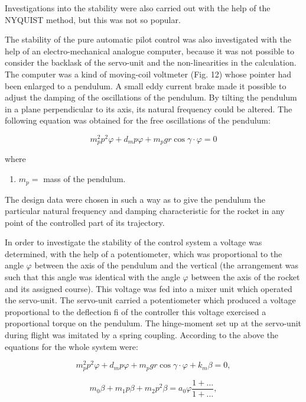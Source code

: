 \documentclass[12pt, a4paper]{article}
\begin{document}
Investigations into the stability were also carried out with the help of the NYQUIST method, but this was not so popular.

The stability of the pure automatic pilot control was also investigated with the help of an electro-mechanical analogue computer, because it was not possible to consider the backlask of the servo-unit and the non-linearities in the calculation. The computer was a kind of moving-coil voltmeter (Fig. 12) whose pointer had been enlarged to a pendulum. A small eddy current brake made it possible to adjust the damping of the oscillations of the pendulum. By tilting the pendulum in a plane perpendicular to its axis, its natural frequency could be altered. The following equation was obtained for the free oscillations of the pendulum:

\begin{equation}
  m_{p}^{2}p^{2}\varphi+d_{m}p\varphi+m_{p}gr\cos{\gamma}\cdot{\varphi}=0
\end{equation}

where
\begin{enumerate}[label={}]
  \item $m_{p} =$ mass of the pendulum.
\end{enumerate}

The design data were chosen in such a way as to give the pendulum the particular natural frequency and damping characteristic for the rocket in any point of the controlled part of its trajectory.

In order to investigate the stability of the control system a voltage was determined, with the help of a potentiometer, which was proportional to the angle $\varphi$ between the axis of the pendulum and the vertical (the arrangement was such that this angle was identical with the angle $\varphi$ between the axis of the rocket and its assigned course). This voltage was fed into a mixer unit which operated the servo-unit. The servo-unit carried a potentiometer which produced a voltage proportional to the deflection fi of the controller this voltage exercised a proportional torque on the pendulum. The hinge-moment set up at the servo-unit during flight was imitated by a spring coupling. According to the above the equations for the whole system were:

\begin{equation}
  m_{p}^{2}p^{2}\varphi+d_{m}p\varphi+m_{p}gr\cos{\gamma}\cdot{\varphi}+k_{m}\beta=0,
\end{equation}

\begin{equation}
  m_{0}\beta+m_{1}p\beta+m_{2}p^{2}\beta=a_{0}\varphi\frac{1+\hdots}{1+\hdots},
\end{equation}
\end{document}
